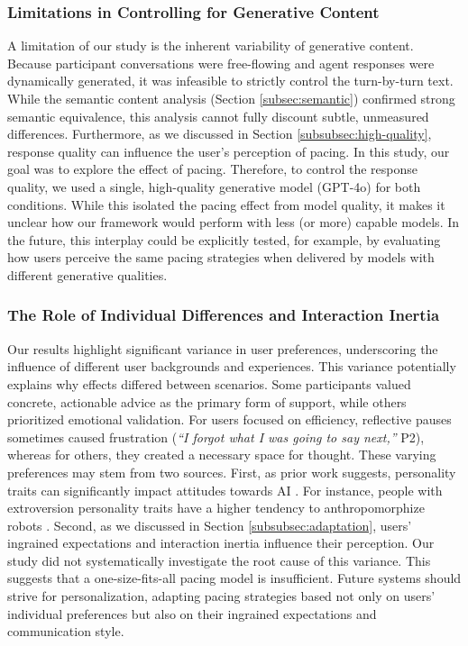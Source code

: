 \subsubsection{Limitations in Controlling for Generative Content}
\label{subsec:limitation_generative}
A limitation of our study is the inherent variability of generative content. Because participant conversations were free-flowing and agent responses were dynamically generated, it was infeasible to strictly control the turn-by-turn text. While the semantic content analysis (Section \ref{subsec:semantic}) confirmed strong semantic equivalence, this analysis cannot fully discount subtle, unmeasured differences.
Furthermore, as we discussed in Section \ref{subsubsec:high-quality}, response quality can influence the user's perception of pacing. In this study, our goal was to explore the effect of pacing. Therefore, to control the response quality, we used a single, high-quality generative model (GPT-4o) for both conditions. While this isolated the pacing effect from model quality, it makes it unclear how our framework would perform with less (or more) capable models.
In the future, this interplay could be explicitly tested, for example, by evaluating how users perceive the same pacing strategies when delivered by models with different generative qualities.

\subsubsection{The Role of Individual Differences and Interaction Inertia}
\label{subsubsec:difference}
Our results highlight significant variance in user preferences, underscoring the influence of different user backgrounds and experiences. This variance potentially explains why effects differed between scenarios. Some participants valued concrete, actionable advice as the primary form of support, while others prioritized emotional validation. 
For users focused on efficiency, reflective pauses sometimes caused frustration (\textit{``I forgot what I was going to say next,''} P2), whereas for others, they created a necessary space for thought. 
These varying preferences may stem from two sources. First, as prior work suggests, personality traits can significantly impact attitudes towards AI \cite{stein2024attitudes}. For instance, people with extroversion personality traits have a higher tendency to anthropomorphize robots \cite{kaplan2019relationship}. 
Second, as we discussed in Section \ref{subsubsec:adaptation}, users' ingrained expectations and interaction inertia \cite{gnewuch2022opposing, 10.1145/3290605.3300768} influence their perception.
Our study did not systematically investigate the root cause of this variance.
This suggests that a one-size-fits-all pacing model is insufficient. Future systems should strive for personalization, adapting pacing strategies based not only on users' individual preferences but also on their ingrained expectations and communication style.

